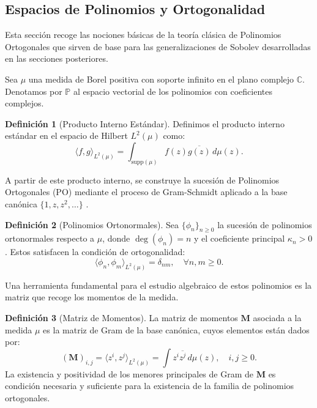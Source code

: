 \documentclass[12pt,a4paper]{article}
\theoremstyle{definition}
\newtheorem{definition}{Definición}
\theoremstyle{remark}
\begin{document}
\subsection{Espacios de Polinomios y Ortogonalidad}

Esta sección recoge las nociones básicas de la teoría clásica de Polinomios Ortogonales que sirven de base para las generalizaciones de Sobolev desarrolladas en las secciones posteriores.

Sea $\mu$ una medida de Borel positiva con soporte infinito en el plano complejo $\mathbb{C}$. Denotamos por $\mathbb{P}$ al espacio vectorial de los polinomios con coeficientes complejos.

\begin{definition}[Producto Interno Estándar] \label{def:producto_estandar}
	Definimos el producto interno estándar en el espacio de Hilbert $L^2(\mu)$ como:
	\begin{equation}
		\langle f, g \rangle_{L^2(\mu)} = \int_{\text{supp}(\mu)} f(z) \overline{g(z)} \, d\mu(z).
	\end{equation}
\end{definition}

A partir de este producto interno, se construye la sucesión de Polinomios Ortogonales (PO) mediante el proceso de Gram-Schmidt aplicado a la base canónica $\{1, z, z^2, \dots\}$ \cite{szego1975orthogonal}.

\begin{definition}[Polinomios Ortonormales] \label{def:polinomios_ortonormales}
	Sea $\{\phi_n\}_{n \geq 0}$ la sucesión de polinomios ortonormales respecto a $\mu$, donde $\deg(\phi_n) = n$ y el coeficiente principal $\kappa_n > 0$. Estos satisfacen la condición de ortogonalidad:
	\begin{equation}
		\langle \phi_n, \phi_m \rangle_{L^2(\mu)} = \delta_{nm}, \quad \forall n,m \geq 0.
	\end{equation}
\end{definition}

Una herramienta fundamental para el estudio algebraico de estos polinomios es la matriz que recoge los momentos de la medida.

\begin{definition}[Matriz de Momentos] \label{def:matriz_momentos}
	La matriz de momentos $\mathbf{M}$ asociada a la medida $\mu$ es la matriz de Gram de la base canónica, cuyos elementos están dados por:
	\begin{equation}
		(\mathbf{M})_{i,j} = \langle z^i, z^j \rangle_{L^2(\mu)} = \int z^i \overline{z^j} \, d\mu(z), \quad i,j \geq 0.
	\end{equation}
	La existencia y positividad de los menores principales de Gram de $\mathbf{M}$ es condición necesaria y suficiente para la existencia de la familia de polinomios ortogonales.
\end{definition}
\end{document}
